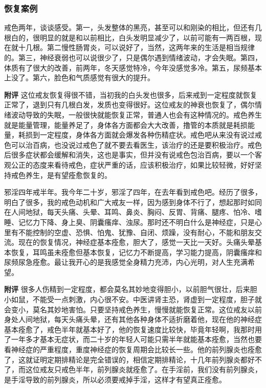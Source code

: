 \subsubsection{恢复案例}

\begin{case}[神经衰弱]
    戒色两年，谈谈感受。第一，头发整体的黑亮，甚至可以和刚染的相比，但还有几根白的，很明显的就是和以前相比，白头发明显减少了，以前可能有一两百根，现在就十几根。第二慢性肠胃炎，可以说好了，当然，这两年来的生活是相当规律的。第三，神经衰弱也可以说很少了，只是偶尔遇到情绪波动，才会失眠。第四，体质有了很大的改善，前两年，冬天感觉特冷，今年没感觉多冷。第五，尿频基本上没了。第六，脸色和气质感觉有很大的提升。

    \textbf{附评} 这位戒友恢复得很不错，当初我的白头发也很多，后来戒到一定程度就恢复正常了，退到只有几根白发，发质也变得很好。这位戒友的神衰也恢复了，偶尔情绪波动导致的失眠，一般很快就能恢复正常，普通人也会有这种情况的。戒色养生就是能量管理，能量养足了，身体各方面都会大大改善，撸管的本质就是耗损能量，耗损到一定程度，身体各方面就会爆发各种伤精症状。戒色吧从来没有说过戒色可以治百病，也没说过戒色了就不要去看医生，该治疗的还是要积极治疗。戒色后很多症状都会缓解和消失，这也是事实，但并没有说戒色包治百病，要以一个客观公正的态度来看待戒色，症状严重的话，应该积极治疗，如果比较轻微，好好坚持戒色养生，是有望痊愈恢复的。
\end{case}

\begin{case}[神经衰弱]
    邪淫四年戒半年。我今年二十岁，邪淫了四年，在去年看到戒色吧。经历了很多，明白了很多，我的戒色动机和广大戒友一样，因为感到身体不行了，想起那时如同在人间地狱，每天头痛、头晕、耳鸣、鼻炎、胸闷、反胃、背痛、腿疼、怕冷、嗜睡、记忆力下降、身上臭、阴囊瘙痒、浊尿。那时还不明白什么是神经症，只是心里有不能控制的空虚、恐惧、怕鬼、犹豫、自闭、烦躁，没有耐心，不能和朋友交流。现在的恢复情况，神经症基本痊愈，胆大了，感觉一天比一天好。头痛头晕基本恢复，耳鸣虽未痊愈但基本恢复，记忆力不断提高，学习能力提高，阴囊瘙痒和尿频尿急痊愈。最让我开心的是我感觉全身精力充沛，内心光明，对人生充满希望。

    \textbf{附评} 很多人伤精到一定程度，都会莫名其妙地变得胆小，以前胆气很壮，后来胆小如鼠，不能受一点刺激，内心很不安。中医讲肾主恐，肾虚到一定程度，胆子就会变小，莫名其妙地害怕。只要坚持戒色养生，慢慢就能恢复正常。这位戒友以前身处人间地狱，每天头痛头晕，还有其他各种身体不适折磨着他，现在他的神经症基本痊愈了，戒色半年就基本好了，他的恢复速度比较快，毕竟年轻啊，我那时用了一年多才基本无症状，而二十岁的年轻人可能只需半年就能基本痊愈，当然也要看神经症的严重程度，重度神经症的恢复周期会比较长一些。他的前列腺炎也痊愈了，这就证明定期排精论是完全错误的，相信定期排精论，十几年前列腺炎都好不了，而这位戒友只戒色半年，前列腺炎就痊愈了。在手淫前，我们没有前列腺炎，是手淫导致的前列腺炎，所以必须要戒掉手淫，这样才有望真正痊愈。
\end{case}


